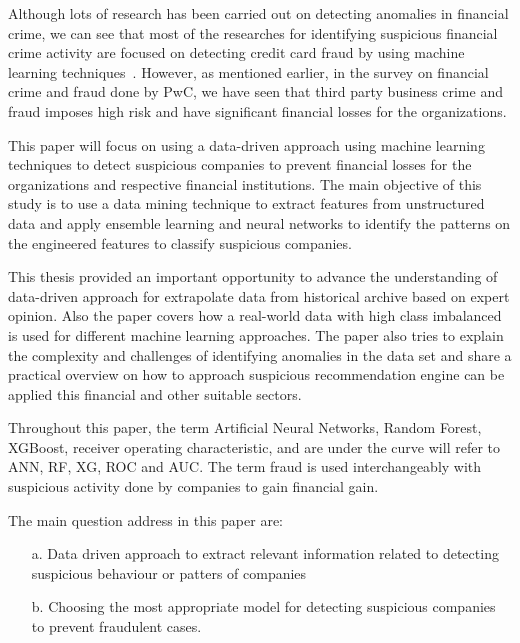 Although lots of research has been carried out on detecting anomalies in financial crime, we can see that most of the researches for identifying suspicious financial crime activity are focused on detecting credit card fraud by using machine learning techniques~\cite{RB2021}.  However, as mentioned earlier, in the survey on financial crime and fraud done by PwC, we have seen that third party business crime and fraud imposes high risk and have significant financial losses for the organizations.



This paper will focus on using a data-driven approach using machine learning techniques to detect suspicious companies to prevent financial losses for the organizations and respective financial institutions. The main objective of this study is to use a data mining technique to extract features from unstructured data and apply ensemble learning and neural networks to identify the patterns on the engineered features to classify suspicious companies. 









This thesis provided an important opportunity to advance the understanding of data-driven approach for extrapolate data from historical archive based on expert opinion. Also the paper covers how a real-world data with high class imbalanced is used for different machine learning approaches. The paper also tries to explain the complexity and challenges of identifying anomalies in the data set and share a practical overview on how to approach suspicious recommendation engine can be applied this financial and other suitable sectors.





Throughout this paper, the term Artificial Neural Networks, Random Forest, XGBoost, receiver operating characteristic, and are under the curve will refer to ANN, RF, XG, ROC and AUC. The term fraud is used interchangeably with suspicious activity done by companies to gain financial gain.



The main question address in this paper are:
\begin{itemize}
    \item[a.] Data driven approach to extract relevant information related to detecting suspicious behaviour or patters of companies
    \item[b.] Choosing the most appropriate model for detecting suspicious companies to prevent fraudulent cases.
\end{itemize}

